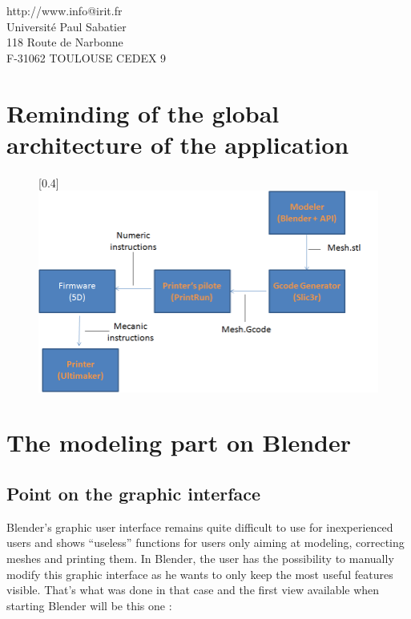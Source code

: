 \documentclass{article}
\begin{document}
\begin{center}
http://www.info@irit.fr\\
Université Paul Sabatier \\
118 Route de Narbonne \\
F-31062 TOULOUSE CEDEX 9
\end{center}

\thispagestyle{empty}

\newpage

\tableofcontents

\newpage

\section{Reminding of the global architecture of the application}


\begin{figure}[!h]
\begin{center}
\scalebox{0.4}[0.4]{\includegraphics{./Images/ARD1}}
\end{center}
\end{figure}

\newpage

\section{The modeling part on Blender}

\subsection{Point on the graphic interface}

Blender's graphic user interface remains quite difficult to use for inexperienced users and shows ``useless'' functions for users only aiming at modeling, correcting meshes and printing them. In Blender, the user has the possibility to manually modify this graphic interface as he wants to only keep the most useful features visible. That's what was done in that case and the first view available when starting Blender will be this one : 
\bigskip
\bigskip
\end{document}
